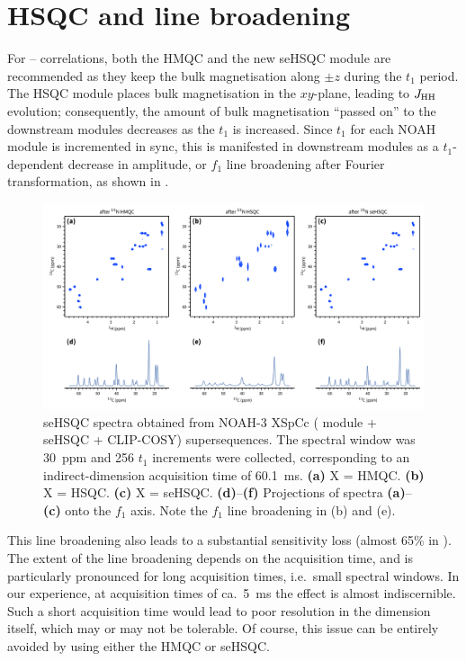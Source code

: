 \section{\texorpdfstring{\nitrogen{}}{15N} HSQC and line broadening}

For \nitrogen{}--\proton{} correlations, both the HMQC and the new seHSQC module are recommended as they keep the bulk magnetisation along $\pm z$ during the $t_1$ period.
The HSQC module places bulk magnetisation in the $xy$-plane, leading to $\jhh$ evolution; consequently, the amount of bulk magnetisation ``passed on'' to the downstream modules decreases as the \nitrogen{} $t_1$ is increased.
Since $t_1$ for each NOAH module is incremented in sync, this is manifested in downstream modules as a $t_1$-dependent decrease in amplitude, or $f_1$ line broadening after Fourier transformation, as shown in .

\begin{figure}
    \centering
    \includegraphics[width=\textwidth]{./figures/n15_linebroadening.png}
    \caption{
        \carbon{} seHSQC spectra obtained from NOAH-3 XSpCc (\nitrogen{} module + \carbon{} seHSQC + CLIP-COSY) supersequences.
        \grami{}
        The \nitrogen{} spectral window was \SI{30}{ppm} and 256 $t_1$ increments were collected, corresponding to an indirect-dimension \nitrogen{} acquisition time of \SI{60.1}{\ms}.
        \textbf{(a)} X = HMQC.
        \textbf{(b)} X = HSQC.
        \textbf{(c)} X = seHSQC.
        \textbf{(d)}--\textbf{(f)} Projections of spectra \textbf{(a)}--\textbf{(c)} onto the $f_1$ axis.
        Note the $f_1$ line broadening in (b) and (e).
    }
    \label{fig:n15_linebroadening}
\end{figure}

This line broadening also leads to a substantial sensitivity loss (almost 65\% in ).
The extent of the line broadening depends on the acquisition time, and is particularly pronounced for long acquisition times, i.e.\ small \nitrogen{} spectral windows.
In our experience, at \nitrogen{} acquisition times of ca.\ \SI{5}{\ms} the effect is almost indiscernible.
Such a short acquisition time would lead to poor resolution in the \nitrogen{} dimension itself, which may or may not be tolerable.
Of course, this issue can be entirely avoided by using either the HMQC or seHSQC.

